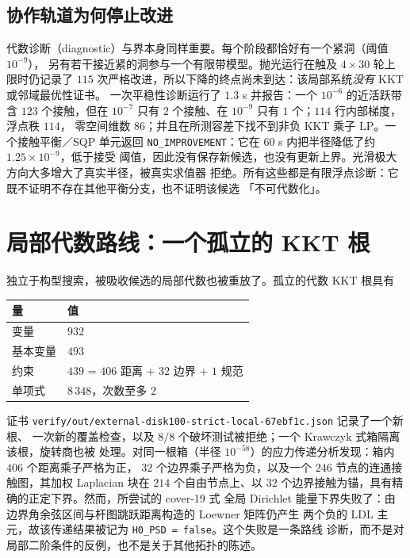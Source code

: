 \subsection{协作轨道为何停止改进}

代数诊断（diagnostic）与界本身同样重要。每个阶段都恰好有一个紧洞（阈值 $10^{-9}$），
另有若干接近紧的洞参与一个有限带模型。抛光运行在触及 $4\times30$ 轮上限时仍记录了
$115$ 次严格改进，所以下降的终点尚未到达：该局部系统\emph{没有} KKT 或邻域最优性证书。
一次平稳性诊断运行了 $1.3$ s 并报告：一个 $10^{-6}$ 的近活跃带含 $123$ 个接触，但在
$10^{-7}$ 只有 $2$ 个接触、在 $10^{-9}$ 只有 $1$ 个；$114$ 行内部梯度，浮点秩 $114$，
零空间维数 $86$；并且在所测容差下找不到非负 KKT 乘子 LP。一个接触平衡／SQP 单元返回
\texttt{NO\_\allowbreak{}IMPROVEMENT}：它在 $60$ s 内把半径降低了约 $1.25\times10^{-9}$，低于接受
阈值，因此没有保存新候选，也没有更新上界。光滑极大方向大多增大了真实半径，被真实求值器
拒绝。所有这些都是有限浮点诊断：它既不证明不存在其他平衡分支，也不证明该候选
「不可代数化」。

\section{局部代数路线：一个孤立的 KKT 根}

独立于构型搜索，被吸收候选的局部代数也被重放了。孤立的代数 KKT 根具有

\begin{center}
\footnotesize
\begin{tabular}{@{}ll@{}}
\toprule
量 & 值 \\
\midrule
变量 & $932$ \\
基本变量 & $493$ \\
约束 & $439$ = $406$ 距离 + $32$ 边界 + $1$ 规范 \\
单项式 & $8\,348$，次数至多 $2$ \\
\bottomrule
\end{tabular}
\end{center}

证书 {\footnotesize\texttt{verify/\allowbreak{}out/\allowbreak{}external-\allowbreak{}disk100-\allowbreak{}strict-\allowbreak{}local-\allowbreak{}67ebf1c.json}} 记录了一个新根、
一次新的覆盖检查，以及 $8/8$ 个破坏测试被拒绝；一个 Krawczyk 式箱隔离该根，旋转商也被
处理。对同一根箱（半径 $10^{-58}$）的应力传递分析发现：箱内 $406$ 个距离乘子严格为正，
$32$ 个边界乘子严格为负，以及一个 $246$ 节点的连通接触图，其加权 Laplacian 块在 $214$
个自由节点上、以 $32$ 个边界接触为锚，具有精确的正定下界。然而，所尝试的 cover-19 式
全局 Dirichlet 能量下界失败了：由边界角余弦区间与杆图跳跃距离构造的 Loewner 矩阵仍产生
两个负的 LDL 主元，故该传递结果被记为 \texttt{H0\_\allowbreak{}PSD = false}。这个失败是一条路线
诊断，而不是对局部二阶条件的反例，也不是关于其他拓扑的陈述。

